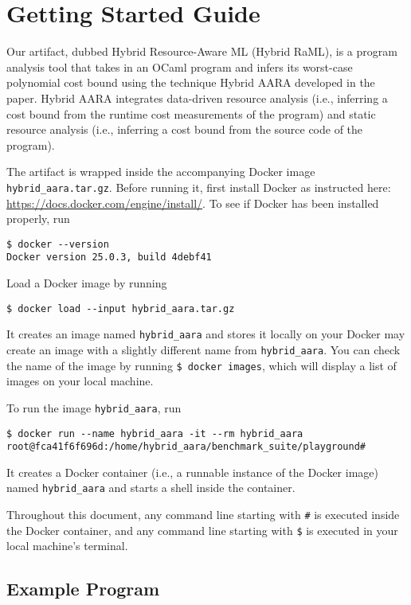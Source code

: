 
\section{Getting Started Guide}

Our artifact, dubbed Hybrid Resource-Aware ML (Hybrid RaML), is a program analysis tool
that takes in an OCaml program and infers its worst-case polynomial cost bound
using the technique Hybrid AARA developed in the paper.
%
Hybrid AARA integrates data-driven resource analysis (i.e., inferring a cost
bound from the runtime cost measurements of the program) and static resource
analysis (i.e., inferring a cost bound from the source code of the program).

The artifact is wrapped inside the accompanying Docker image
\texttt{hybrid\_aara.tar.gz}.
%
Before running it, first install Docker as instructed here:
\url{https://docs.docker.com/engine/install/}.
%
To see if Docker has been installed properly, run
\begin{verbatim}
$ docker --version
Docker version 25.0.3, build 4debf41
\end{verbatim}

Load a Docker image by running
\begin{verbatim}
$ docker load --input hybrid_aara.tar.gz
\end{verbatim}
%
It creates an image named \texttt{hybrid\_aara} and stores it locally on your
%
Docker may create an image with a slightly different name from
\texttt{hybrid\_aara}.
%
You can check the name of the image by running \verb|$ docker images|, which
will display a list of images on your local machine.

To run the image \texttt{hybrid\_aara}, run
\begin{verbatim}
$ docker run --name hybrid_aara -it --rm hybrid_aara
root@fca41f6f696d:/home/hybrid_aara/benchmark_suite/playground#
\end{verbatim}
%
It creates a Docker container (i.e., a runnable instance of the Docker image)
named \texttt{hybrid\_aara} and starts a shell inside the container.

Throughout this document, any command line starting with \texttt{\#} is executed
inside the Docker container, and any command line starting with \texttt{\$} is
executed in your local machine's terminal.

\subsection{Example Program}
\label{sec:Example Program}

